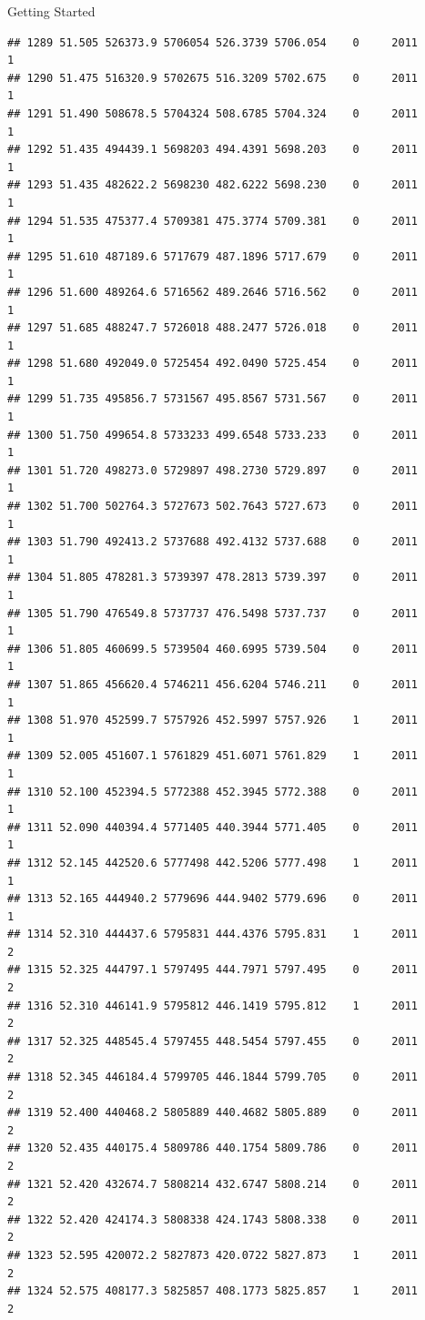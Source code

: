 \documentclass[
  ignorenonframetext,
]{beamer}
\begin{document}
\begin{frame}[fragile]{Getting Started}
\begin{verbatim}
## 1289 51.505 526373.9 5706054 526.3739 5706.054    0     2011        1
## 1290 51.475 516320.9 5702675 516.3209 5702.675    0     2011        1
## 1291 51.490 508678.5 5704324 508.6785 5704.324    0     2011        1
## 1292 51.435 494439.1 5698203 494.4391 5698.203    0     2011        1
## 1293 51.435 482622.2 5698230 482.6222 5698.230    0     2011        1
## 1294 51.535 475377.4 5709381 475.3774 5709.381    0     2011        1
## 1295 51.610 487189.6 5717679 487.1896 5717.679    0     2011        1
## 1296 51.600 489264.6 5716562 489.2646 5716.562    0     2011        1
## 1297 51.685 488247.7 5726018 488.2477 5726.018    0     2011        1
## 1298 51.680 492049.0 5725454 492.0490 5725.454    0     2011        1
## 1299 51.735 495856.7 5731567 495.8567 5731.567    0     2011        1
## 1300 51.750 499654.8 5733233 499.6548 5733.233    0     2011        1
## 1301 51.720 498273.0 5729897 498.2730 5729.897    0     2011        1
## 1302 51.700 502764.3 5727673 502.7643 5727.673    0     2011        1
## 1303 51.790 492413.2 5737688 492.4132 5737.688    0     2011        1
## 1304 51.805 478281.3 5739397 478.2813 5739.397    0     2011        1
## 1305 51.790 476549.8 5737737 476.5498 5737.737    0     2011        1
## 1306 51.805 460699.5 5739504 460.6995 5739.504    0     2011        1
## 1307 51.865 456620.4 5746211 456.6204 5746.211    0     2011        1
## 1308 51.970 452599.7 5757926 452.5997 5757.926    1     2011        1
## 1309 52.005 451607.1 5761829 451.6071 5761.829    1     2011        1
## 1310 52.100 452394.5 5772388 452.3945 5772.388    0     2011        1
## 1311 52.090 440394.4 5771405 440.3944 5771.405    0     2011        1
## 1312 52.145 442520.6 5777498 442.5206 5777.498    1     2011        1
## 1313 52.165 444940.2 5779696 444.9402 5779.696    0     2011        1
## 1314 52.310 444437.6 5795831 444.4376 5795.831    1     2011        2
## 1315 52.325 444797.1 5797495 444.7971 5797.495    0     2011        2
## 1316 52.310 446141.9 5795812 446.1419 5795.812    1     2011        2
## 1317 52.325 448545.4 5797455 448.5454 5797.455    0     2011        2
## 1318 52.345 446184.4 5799705 446.1844 5799.705    0     2011        2
## 1319 52.400 440468.2 5805889 440.4682 5805.889    0     2011        2
## 1320 52.435 440175.4 5809786 440.1754 5809.786    0     2011        2
## 1321 52.420 432674.7 5808214 432.6747 5808.214    0     2011        2
## 1322 52.420 424174.3 5808338 424.1743 5808.338    0     2011        2
## 1323 52.595 420072.2 5827873 420.0722 5827.873    1     2011        2
## 1324 52.575 408177.3 5825857 408.1773 5825.857    1     2011        2

\end{verbatim}
\end{frame}
\end{document}
